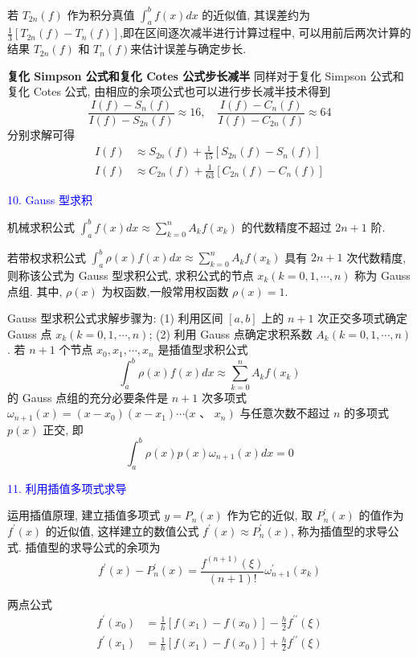 若 $ T_{2 n}(f) $ 作为积分真值 $ \int_{a}^{b} f(x) d x $ 的近似值, 其误差约为 $ \frac{1}{3}\left[T_{2 n}(f)-T_{n}(f)\right] $,即在区间逐次减半进行计算过程中, 可以用前后两次计算的结果 $ T_{2 n}(f) $ 和 $ T_{n}(f) $来估计误差与确定步长.

\textbf{复化 Simpson 公式和复化 Cotes 公式步长减半} \; 同样对于复化 Simpson 公式和复化 Cotes 公式, 由相应的余项公式也可以进行步长减半技术得到
$$
\frac{I(f)-S_{n}(f)}{I(f)-S_{2 n}(f)} \approx 16, \quad \frac{I(f)-C_{n}(f)}{I(f)-C_{2 n}(f)} \approx 64
$$
分别求解可得
$$
\begin{aligned}
I(f) &\approx S_{2 n}(f)+\frac{1}{15}\left[S_{2 n}(f)-S_{n}(f)\right] \\
I(f) &\approx C_{2 n}(f)+\frac{1}{63}\left[C_{2 n}(f)-C_{n}(f)\right]
\end{aligned}
$$

\textcolor{blue}{10. Gauss 型求积}

机械求积公式 $\displaystyle \int_{a}^{b} f(x) d x \approx \sum_{k=0}^{n} A_{k} f\left(x_{k}\right) $ 的代数精度不超过 $ 2 n+1 $ 阶.

若带权求积公式 $\displaystyle \int_{a}^{b} \rho(x) f(x) d x \approx \sum_{k=0}^{n} A_{k} f\left(x_{k}\right) $ 具有 $ 2 n+1 $ 次代数精度, 则称该公式为 Gauss 型求积公式, 求积公式的节点 $ x_{k}(k=0,1, \cdots, n) $ 称为 Gauss 点组. 其中, $ \rho(x) $ 为权函数,一般常用权函数 $ \rho(x)=1 $.

Gauss 型求积公式求解步骤为:
(1) 利用区间 $ [a, b] $ 上的 $ n+1 $ 次正交多项式确定 Gauss 点 $ x_{k}(k=0,1, \cdots, n) $;
(2) 利用 Gauss 点确定求积系数 $ A_{k}(k=0,1, \cdots, n) $.
若 $ n+1 $ 个节点 $ x_{0}, x_{1}, \cdots, x_{n} $ 是插值型求积公式
$$
\int_{a}^{b} \rho(x) f(x) d x \approx \sum_{k=0}^{n} A_{k} f\left(x_{k}\right)
$$
的 Gauss 点组的充分必要条件是 $ n+1 $ 次多项式 $ \omega_{n+1}(x)=\left(x-x_{0}\right)\left(x-x_{1}\right) \cdots(x $ 、 $ \left.x_{n}\right) $ 与任意次数不超过 $ n $ 的多项式 $ p(x) $ 正交, 即
$$
\int_{a}^{b} \rho(x) p(x) \omega_{n+1}(x) d x=0
$$

\textcolor{blue}{11. 利用插值多项式求导}

运用插值原理, 建立插值多项式 $ y=P_{n}(x) $ 作为它的近似, 取 $ P_{n}^{\prime}(x) $ 的值作为 $ f^{\prime}(x) $ 的近似值, 这样建立的数值公式 $ f^{\prime}(x) \approx P_{n}^{\prime}(x) $, 称为插值型的求导公式.
插值型的求导公式的余项为
$$
f^{\prime}(x)-P_{n}^{\prime}(x)=\frac{f^{(n+1)}(\xi)}{(n+1)!} \omega_{n+1}^{\prime}\left(x_{k}\right)
$$

两点公式
$$
\begin{aligned}
f^{\prime}\left(x_{0}\right) & =\frac{1}{h}\left[f\left(x_{1}\right)-f\left(x_{0}\right)\right]-\frac{h}{2} f^{\prime \prime}(\xi) \\
f^{\prime}\left(x_{1}\right) & =\frac{1}{h}\left[f\left(x_{1}\right)-f\left(x_{0}\right)\right]+\frac{h}{2} f^{\prime \prime}(\xi)
\end{aligned}
$$

